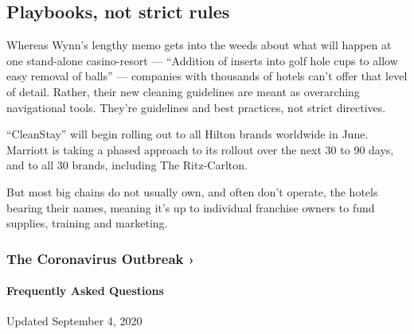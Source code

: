 \hypertarget{playbooks-not-strict-rules}{%
\subsection{Playbooks, not strict
rules}\label{playbooks-not-strict-rules}}

Whereas Wynn's lengthy memo gets into the weeds about what will happen
at one stand-alone casino-resort --- ``Addition of inserts into golf
hole cups to allow easy removal of balls'' --- companies with thousands
of hotels can't offer that level of detail. Rather, their new cleaning
guidelines are meant as overarching navigational tools. They're
guidelines and best practices, not strict directives.

``CleanStay'' will begin rolling out to all Hilton brands worldwide in
June. Marriott is taking a phased approach to its rollout over the next
30 to 90 days, and to all 30 brands, including The Ritz-Carlton.

But most big chains do not usually own, and often don't operate, the
hotels bearing their names, meaning it's up to individual franchise
owners to fund supplies, training and marketing.

\href{https://www.nytimes3xbfgragh.onion/news-event/coronavirus?action=click\&pgtype=Article\&state=default\&region=MAIN_CONTENT_3\&context=storylines_faq}{}

\hypertarget{the-coronavirus-outbreak-}{%
\subsubsection{The Coronavirus Outbreak
›}\label{the-coronavirus-outbreak-}}

\hypertarget{frequently-asked-questions}{%
\paragraph{Frequently Asked
Questions}\label{frequently-asked-questions}}

Updated September 4, 2020

